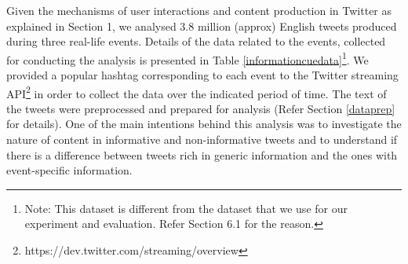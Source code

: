 Given the mechanisms of user interactions and content production  in Twitter as explained in Section 1, we analysed 3.8 million (approx) English tweets produced during three real-life events. Details of the data related to the events, collected for conducting the analysis is presented in Table \ref{informationcuedata}\footnote{\tiny Note: This dataset is different from the dataset that we use for our experiment and evaluation. Refer Section 6.1 for the reason.}. We provided a popular hashtag corresponding to each event to the Twitter streaming API\footnote{\tiny https://dev.twitter.com/streaming/overview} in order to collect the data over the indicated period of time. The text of the tweets were preprocessed and prepared for analysis (Refer Section \ref{dataprep} for details). One of the main intentions behind this analysis was to investigate the nature of content in informative and non-informative tweets and to understand if there is a difference between tweets rich in generic information and the ones with event-specific information. 






